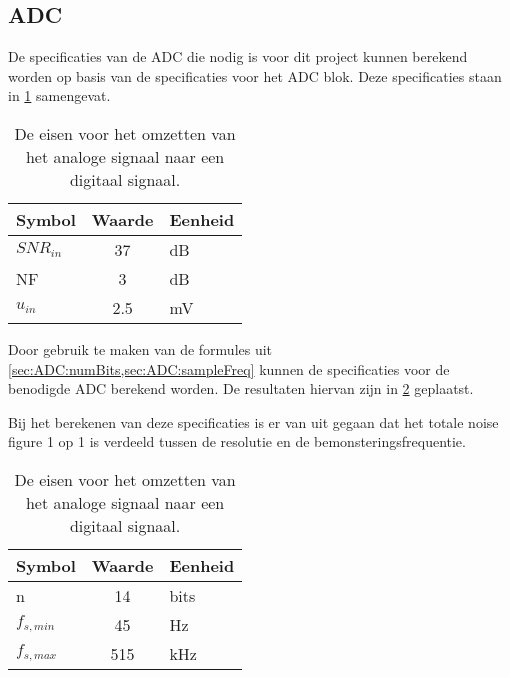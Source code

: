 \subsection{ADC} \label{sec:selectingADCandReqs}
De specificaties van de ADC die nodig is voor dit project kunnen berekend worden op basis van de specificaties voor het ADC blok. Deze specificaties staan in \cref{tab:systemSpecADC} samengevat.
\begin{table}[!htbp]
    \centering
    \begin{tabular}{l|c|l}
        Symbol      & Waarde & Eenheid\\\hline
        $SNR_{in}$  & 37        & dB\\
        NF          & 3         & dB\\
        $u_{in}$    & 2.5       & mV\\
    \end{tabular}
    \caption{De eisen voor het omzetten van het analoge signaal naar een digitaal signaal.}
    \label{tab:systemSpecADC}
\end{table}

Door gebruik te maken van de formules uit \cref{sec:ADC:numBits,sec:ADC:sampleFreq} kunnen de specificaties voor de benodigde ADC berekend worden. De resultaten hiervan zijn in  \cref{tab:specADC} geplaatst.

Bij het berekenen van deze specificaties is er van uit gegaan dat het totale noise figure 1 op 1 is verdeeld tussen de resolutie en de bemonsteringsfrequentie.
\begin{table}[!htbp]
    \centering
    \begin{tabular}{l|c|l}
        Symbol      & Waarde    & Eenheid\\\hline
        n           & 14        & bits\\
        $f_{s,min}$ & 45        & Hz\\
        $f_{s,max}$ & 515       & kHz\\
    \end{tabular}
    \caption{De eisen voor het omzetten van het analoge signaal naar een digitaal signaal.}
    \label{tab:specADC}
\end{table}

